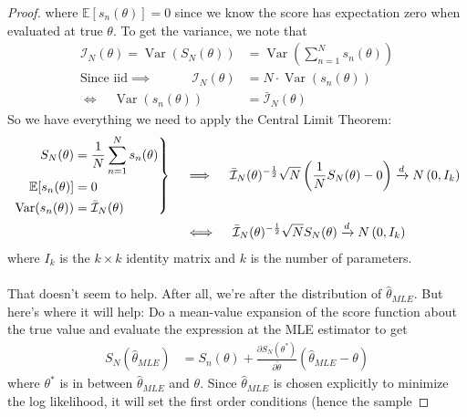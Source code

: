 \documentclass[12pt]{article}
\theoremstyle{plain}
\theoremstyle{definition}
\theoremstyle{remark}
\newcommand{\calI}{\mathcal{I}}
\newcommand{\E}{\mathbb{E}}
\newenvironment{rcases}
  {\left.\begin{aligned}}
  {\end{aligned}\right\rbrace}
\newcommand{\Var}{\operatorname{Var}}
\newcommand{\dto}{\xrightarrow{d}}
\newcommand{\sumnN}{\sum^N_{n=1}}
\begin{document}
\begin{proof}
where $\E[s_n(\theta)] = 0$ since we know the score has expectation zero
when evaluated at true $\theta$.
To get the variance, we note that
\begin{align*}
  \calI_N(\theta)
  = \Var(S_N(\theta))
  &= \Var\left(\sumnN s_n(\theta)\right) \\
  \text{Since iid}
  \implies\quad\qquad
  \calI_N(\theta)
  &= N \cdot \Var\left(s_n(\theta)\right) \\
  \iff\quad
  \Var\left(s_n(\theta)\right)
  &= \bar{\calI}_N(\theta)
\end{align*}
So we have everything we need to apply the Central Limit Theorem:
\begin{align}
  \begin{rcases}
    S_N(\theta) &= \frac{1}{N} \sumnN s_n(\theta) \\
    \E[s_n(\theta)] &= 0 \\
    \Var(s_n(\theta)) &= \bar{\calI}_N(\theta)
  \end{rcases}
  \quad&\implies \quad
    \bar{\calI}_N(\theta)^{-\frac{1}{2}}\sqrt{N}
    \left(\frac{1}{N} S_N(\theta) - 0 \right)
    \dto N\left(0,I_k\right)
  \notag\\
  \quad&\iff \quad
    \bar{\calI}_N(\theta)^{-\frac{1}{2}}\sqrt{N}
    S_N(\theta)
    \dto N\left(0,I_k\right)
  \label{scoreconverge}
\end{align}
where $I_k$ is the $k\times k$ identity matrix and $k$ is the number of
parameters.
\\
\\
That doesn't seem to help. After all, we're after the distribution of
$\hat{\theta}_{MLE}$. But here's where it will help: Do a mean-value
expansion of the score function about the true value and evaluate the
expression at the MLE estimator to get
\begin{align*}
  S_N(\hat{\theta}_{MLE})
  &= S_n(\theta)
  + \frac{\partial S_N(\theta^*)}{\partial \tilde{\theta}}
    (\hat{\theta}_{MLE} - \theta)
\end{align*}
where $\theta^*$ is in between $\hat{\theta}_{MLE}$ and $\theta$.
Since $\hat{\theta}_{MLE}$ is chosen explicitly to minimize the log
likelihood, it will set the first order conditions (hence the sample

\end{proof}
\end{document}
